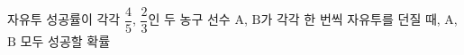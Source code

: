 자유투 성공률이 각각 $\dfrac{4}{5}$, $\dfrac{2}{3}$인 두 농구 선수 $\mathrm{A}$, $\mathrm{B}$가 각각 한 번씩 자유투를 던질 때, $\mathrm{A}$, $\mathrm{B}$ 모두 성공할 확률
